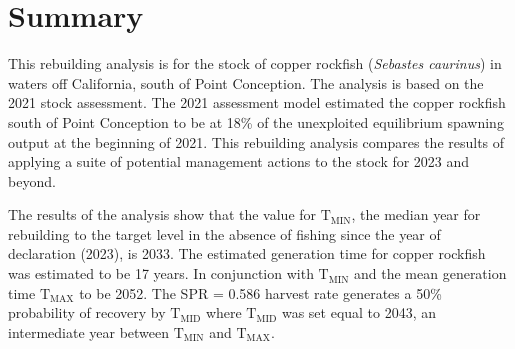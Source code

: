 \documentclass[11pt,
  english,
  a4paper,
]{article}
\begin{document}
\newcommand{\lt}{\ensuremath <}
\newcommand{\gt}{\ensuremath >}

\pagebreak
{}
\setcounter{page}{1}

\renewcommand{\thetable}{\roman{table}}
\renewcommand{\thefigure}{\roman{figure}}

\setlength\parskip{0.5em plus 0.1em minus 0.2em}


\hypertarget{summary}{%
\section*{Summary}\label{summary}}

\leavevmode\tagmcend\tagstructend


This rebuilding analysis is for the stock of copper rockfish (\emph{Sebastes caurinus}) in waters off California, south of Point Conception. The analysis is based on the 2021 stock assessment. The 2021 assessment model estimated the copper rockfish south of Point Conception to be at 18\% of the unexploited equilibrium spawning output at the beginning of 2021. This rebuilding analysis compares the results of applying a suite of potential management actions to the stock for 2023 and beyond.

\leavevmode\tagmcend\tagstructend\par


The results of the analysis show that the value for {\(\text{T}_\text{MIN}\)\leavevmode\tagmcend\tagstructend}, the median year for rebuilding to the target level in the absence of fishing since the year of declaration (2023), is 2033. The estimated generation time for copper rockfish was estimated to be 17 years. In conjunction with {\(\text{T}_\text{MIN}\)\leavevmode\tagmcend\tagstructend} and the mean generation time {\(\text{T}_\text{MAX}\)\leavevmode\tagmcend\tagstructend} to be 2052. The SPR = 0.586 harvest rate generates a 50\% probability of recovery by {\(\text{T}_\text{MID}\)\leavevmode\tagmcend\tagstructend} where {\(\text{T}_\text{MID}\)\leavevmode\tagmcend\tagstructend} was set equal to 2043, an intermediate year between {\(\text{T}_\text{MIN}\)\leavevmode\tagmcend\tagstructend} and {\(\text{T}_\text{MAX}\)\leavevmode\tagmcend\tagstructend}.
\end{document}
